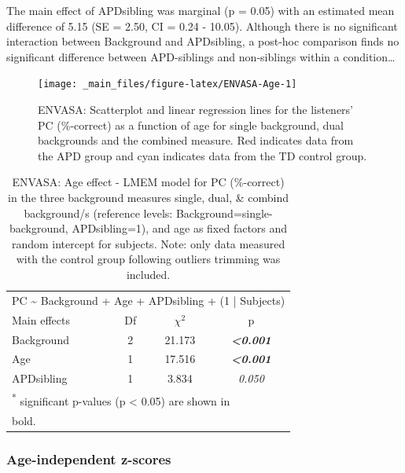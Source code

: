 \documentclass[a4paper, twoside]{templates/ociamthesis}
\begin{document}
\begin{correction}
The main effect of APDsibling was marginal (p = 0.05) with an estimated
mean difference of 5.15 (SE = 2.50, CI = 0.24 - 10.05). Although there
is no significant interaction between Background and APDsibling, a
post-hoc comparison finds no significant difference between APD-siblings
and non-siblings within a condition\ldots{}
\end{correction}

\begin{figure}

{\centering \texttt{[image: \_main\_files/figure-latex/ENVASA-Age-1]} 

}

\caption{ENVASA: Scatterplot and linear regression lines for the listeners' PC (\%-correct) as a function of age for single background, dual backgrounds and the combined measure. Red indicates data from the APD group and cyan indicates data from the TD control group.}\label{fig:ENVASA-Age}
\end{figure}

\begin{table}

\caption{\label{tab:ENVASA-AgeLMEMTabnew}ENVASA: Age effect - LMEM model for PC (\%-correct) in the three background measures single, dual, \& combind background/s (reference levels: Background=single-background, APDsibling=1), and age as fixed factors and random intercept for subjects. Note: only data measured with the control group following outliers trimming was included.}
\centering
\begin{tabular}[t]{lcc>{}c}
\toprule
\multicolumn{4}{c}{PC \textasciitilde{} Background + Age + APDsibling + (1 | Subjects)} \\
\cmidrule(l{3pt}r{3pt}){1-4}
Main effects & Df & $\chi^{2}$ & p\\
\midrule
Background & 2 & 21.173 & \em{\textbf{<0.001}}\\
Age & 1 & 17.516 & \em{\textbf{<0.001}}\\
APDsibling & 1 & 3.834 & \em{0.050}\\
\bottomrule
\multicolumn{4}{l}{\textsuperscript{*} significant p-values (p < 0.05) are shown in}\\
\multicolumn{4}{l}{bold.}\\
\end{tabular}
\end{table}

\hypertarget{age-independent-z-scores-2}{%
\subsubsection*{Age-independent z-scores}\label{age-independent-z-scores-2}}
\end{document}
